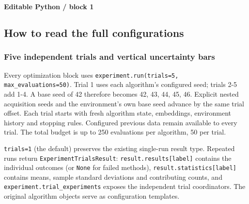 \documentclass[10pt,a4paper]{article}
\newcommand{\CodeFile}[1]{\VerbatimInput[
  fontsize=\fontsize{8.3}{10.7}\selectfont,breaklines=true,
  breakanywhere=true,breakautoindent=true,tabsize=4,
  frame=leftline,framerule=.5pt,rulecolor=\color{BayopyTeal},
  xleftmargin=5pt,framesep=5pt]{#1}}
\newcommand{\BlockLabel}[1]{\Needspace{4\baselineskip}
  {\small\bfseries\color{BayopyTeal}#1}\par\vspace{-3pt}}
\begin{document}
\BlockLabel{Editable Python / block 1}

\CodeFile{code/cell_02.py}

\subsection*{How to read the full configurations}

\subsubsection*{Five independent trials and vertical uncertainty bars}

Every optimization block uses \texttt{experiment.\allowbreak{}run(trials=\allowbreak{}5,\allowbreak{} max\_\allowbreak{}evaluations=\allowbreak{}50)}. Trial 1 uses each algorithm's configured seed; trials 2-5 add 1-4. A base seed of 42 therefore becomes 42,\allowbreak{} 43,\allowbreak{} 44,\allowbreak{} 45,\allowbreak{} 46. Explicit nested acquisition seeds and the environment's own base seed advance by the same trial offset. Each trial starts with fresh algorithm state,\allowbreak{} embeddings,\allowbreak{} environment history and stopping rules. Configured previous data remain available to every trial. The total budget is up to 250 evaluations per algorithm,\allowbreak{} 50 per trial.


\texttt{trials=\allowbreak{}1} (the default) preserves the existing single-run result type. Repeated runs return \texttt{Experiment\allowbreak{}Trials\allowbreak{}Result}: \texttt{result.\allowbreak{}results[label]} contains the individual outcomes (or \texttt{None} for failed methods),\allowbreak{} \texttt{result.\allowbreak{}statistics[label]} contains means,\allowbreak{} sample standard deviations and contributing counts,\allowbreak{} and \texttt{experiment.\allowbreak{}trial\_\allowbreak{}experiments} exposes the independent trial coordinators. The original algorithm objects serve as configuration templates.
\end{document}
